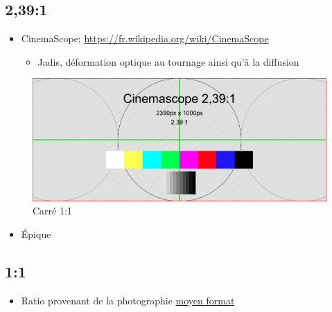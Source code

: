 \documentclass[
  french,
]{book}
\providecommand{\tightlist}{%
  \setlength{\itemsep}{0pt}\setlength{\parskip}{0pt}}
\begin{document}
\hypertarget{section-4}{%
\subsection{2,39:1}\label{section-4}}

\begin{itemize}
\tightlist
\item
  CinemaScope; \url{https://fr.wikipedia.org/wiki/CinemaScope}

  \begin{itemize}
  \tightlist
  \item
    Jadis, déformation optique au tournage ainsi qu'à la diffusion
  \end{itemize}
\end{itemize}

\begin{figure}
\centering
\includegraphics{medias/lexique/Cinemascope_2_39_1_2390x1000.png}
\caption{Carré 1:1}
\end{figure}

\begin{itemize}
\tightlist
\item
  Épique
\end{itemize}

\hypertarget{section-5}{%
\subsection{1:1}\label{section-5}}

\begin{itemize}
\tightlist
\item
  Ratio provenant de la photographie \href{https://fr.wikipedia.org/wiki/Appareil_photographique_de_moyen_format}{moyen format}
\end{itemize}
\end{document}
